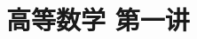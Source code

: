 \documentclass[12pt, a4paper, oneside, UTF8]{ctexbook}
\begin{document}

\else
\fi

\chapter{高等数学 第一讲}



\ifx\allfiles\undefined
\end{document}
